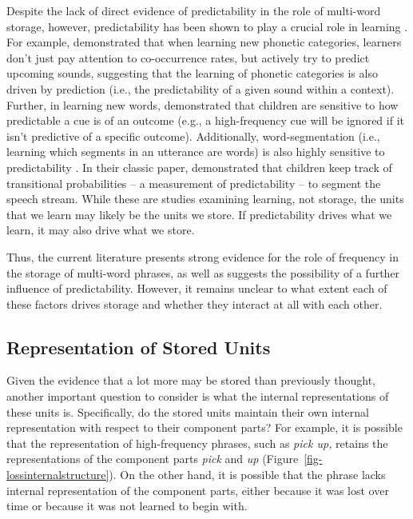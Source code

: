 \documentclass[
  authoryear,
  preprint,
  1p,
  onecolumn]{elsarticle}
\begin{document}
Despite the lack of direct evidence of predictability in the role of
multi-word storage, however, predictability has been shown to play a
crucial role in learning
\citep{olejarczuk2018, ramscar2013, saffran1996}. For example,
\citet{olejarczuk2018} demonstrated that when learning new phonetic
categories, learners don't just pay attention to co-occurrence rates,
but actively try to predict upcoming sounds, suggesting that the
learning of phonetic categories is also driven by prediction (i.e., the
predictability of a given sound within a context). Further, in learning
new words, \citet{ramscar2013} demonstrated that children are sensitive
to how predictable a cue is of an outcome (e.g., a high-frequency cue
will be ignored if it isn't predictive of a specific outcome).
Additionally, word-segmentation (i.e., learning which segments in an
utterance are words) is also highly sensitive to predictability
\citep{saffran1996}. In their classic paper, \citet{saffran1996}
demonstrated that children keep track of transitional probabilities -- a
measurement of predictability -- to segment the speech stream. While
these are studies examining learning, not storage, the units that we
learn may likely be the units we store. If predictability drives what we
learn, it may also drive what we store.

Thus, the current literature presents strong evidence for the role of
frequency in the storage of multi-word phrases, as well as suggests the
possibility of a further influence of predictability. However, it
remains unclear to what extent each of these factors drives storage and
whether they interact at all with each other.

\subsection{Representation of Stored
Units}\label{representation-of-stored-units}

Given the evidence that a lot more may be stored than previously
thought, another important question to consider is what the internal
representations of these units is. Specifically, do the stored units
maintain their own internal representation with respect to their
component parts? For example, it is possible that the representation of
high-frequency phrases, such as \emph{pick up,} retains the
representations of the component parts \emph{pick} and \emph{up}
(Figure~\ref{fig-lossinternalstructure}). On the other hand, it is
possible that the phrase lacks internal representation of the component
parts, either because it was lost over time or because it was not
learned to begin with.
\end{document}
